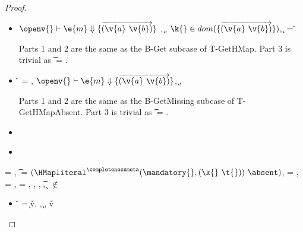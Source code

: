 \begin{lemma}
\begin{proof}
\begin{case}[T-GetHMapPartialDefault]
  \begin{itemize}
    \item[]
      \begin{subcase}[B-Get]
        $\opsem {\openv{}}
        {\e{m}} {\curlymap{\overrightarrow{({\v{a}}\ {\v{b}})}}}$
        ,
         \opsem {\openv{}}
                 {} {\k{}},
         $\keyinmap{\k{}}{\curlymap{\overrightarrow{({\v{a}}\ {\v{b}})}}}$,
          {\k{}} = {\v{}}

         Parts 1 and 2 are the same as the B-Get subcase of T-GetHMap.
         Part 3 is trivial as \t{} = \Top.


      \end{subcase}
    \item[]
      \begin{subcase}[B-GetMissing]
        \v{} = \nil,
        $\opsem {\openv{}}
        {\e{m}} {\curlymap{\overrightarrow{({\v{a}}\ {\v{b}})}}}$,
       \opsem {\openv{}} {} {\k{}},

         Parts 1 and 2 are the same as the B-GetMissing subcase of T-GetHMapAbsent.
         Part 3 is trivial as \t{} = \Top.

      \end{subcase}
    \item[]
      \begin{subcase}[BE-Get1]
      \end{subcase}
    \item[]
      \begin{subcase}[BE-Get2]
      \end{subcase}
  \end{itemize}
\end{case}

\begin{case}[T-AssocHMap]
  \e{} = { {} {}},
  \t{} = ${\HMapgeneric {\extendmandatoryset {\mandatory{}}{\k{}}{\t{}}} {\absent}}$,
  \thenprop{\prop{}} = {\topprop{}},
  \elseprop{\prop{}} = {\botprop{}},
  \object{} = \emptyobject,
  \judgementtwo {\propenv{}} { {\HMapgeneric {\mandatory{}} {\absent}}},
  \judgementtwo {\propenv{}} { {\Value{\k{}}}},
  \judgementtwo {\propenv{}} { {\t{}}},
  {\k{}} $\not\in$ {\absent{}}

  \begin{itemize}
    \item[]
      \begin{subcase}[B-Assoc]
        \v{} = 
        {
                {\k{}}{\v{v}}},
        \opsem {\openv{}}
        {} {},
        \opsem {\openv{}} {} {\k{}},
        \opsem {\openv{}} {} {\v{v}}


\end{subcase}
\end{itemize}
\end{case}
\end{proof}
\end{lemma}
